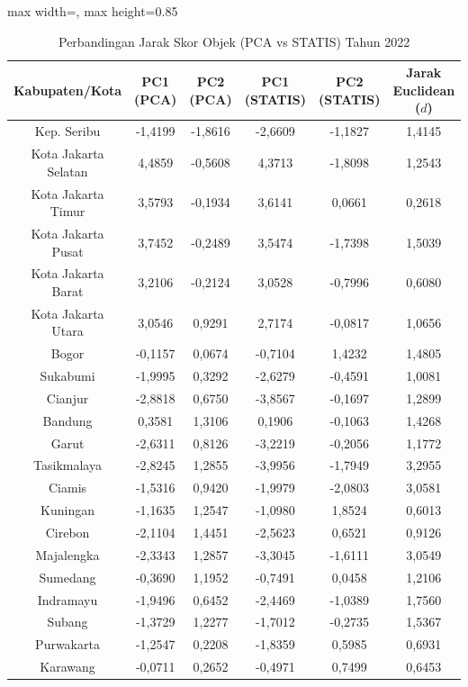 \begin{table}[H]
\centering
\caption{Perbandingan Jarak Skor Objek (PCA vs STATIS) Tahun 2022} \label{tab:app1jarak_skor_2022}
\begin{adjustbox}{max width=\textwidth, max height=0.85\textheight}
\begin{tabular}{|c|c|c|c|c|c|}
\hline
\textbf{Kabupaten/Kota} & \textbf{PC1 (PCA)} & \textbf{PC2 (PCA)} & \textbf{PC1 (STATIS)} & \textbf{PC2 (STATIS)} & \textbf{Jarak Euclidean ($d$)} \\
\hline
Kep. Seribu & -1,4199 & -1,8616 & -2,6609 & -1,1827 & 1,4145 \\
Kota Jakarta Selatan & 4,4859 & -0,5608 & 4,3713 & -1,8098 & 1,2543 \\
Kota Jakarta Timur & 3,5793 & -0,1934 & 3,6141 & 0,0661 & 0,2618 \\
Kota Jakarta Pusat & 3,7452 & -0,2489 & 3,5474 & -1,7398 & 1,5039 \\
Kota Jakarta Barat & 3,2106 & -0,2124 & 3,0528 & -0,7996 & 0,6080 \\
Kota Jakarta Utara & 3,0546 & 0,9291 & 2,7174 & -0,0817 & 1,0656 \\
Bogor & -0,1157 & 0,0674 & -0,7104 & 1,4232 & 1,4805 \\
Sukabumi & -1,9995 & 0,3292 & -2,6279 & -0,4591 & 1,0081 \\
Cianjur & -2,8818 & 0,6750 & -3,8567 & -0,1697 & 1,2899 \\
Bandung & 0,3581 & 1,3106 & 0,1906 & -0,1063 & 1,4268 \\
Garut & -2,6311 & 0,8126 & -3,2219 & -0,2056 & 1,1772 \\
Tasikmalaya & -2,8245 & 1,2855 & -3,9956 & -1,7949 & 3,2955 \\
Ciamis & -1,5316 & 0,9420 & -1,9979 & -2,0803 & 3,0581 \\
Kuningan & -1,1635 & 1,2547 & -1,0980 & 1,8524 & 0,6013 \\
Cirebon & -2,1104 & 1,4451 & -2,5623 & 0,6521 & 0,9126 \\
Majalengka & -2,3343 & 1,2857 & -3,3045 & -1,6111 & 3,0549 \\
Sumedang & -0,3690 & 1,1952 & -0,7491 & 0,0458 & 1,2106 \\
Indramayu & -1,9496 & 0,6452 & -2,4469 & -1,0389 & 1,7560 \\
Subang & -1,3729 & 1,2277 & -1,7012 & -0,2735 & 1,5367 \\
Purwakarta & -1,2547 & 0,2208 & -1,8359 & 0,5985 & 0,6931 \\
Karawang & -0,0711 & 0,2652 & -0,4971 & 0,7499 & 0,6453 \\

\end{tabular}
\end{adjustbox}
\end{table}
